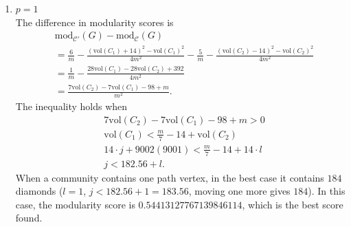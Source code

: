 \documentclass[letterpaper,12pt]{article}
\begin{document}
\begin{enumerate}
      \item $p = 1$\\
            The difference in modularity scores is
            \begin{align*}
                   & \text{mod}_{\mathcal{C'}}(G) - \text{mod}_{\mathcal{C}} (G)                                                                                       \\
                   & = \frac{6}{m} - \frac{(\text{vol}(C_1)+14)^2 - \text{vol}(C_1)^2}{4m^2} - \frac{5}{m} - \frac{(\text{vol}(C_2) - 14)^2 - \text{vol}(C_2)^2}{4m^2} \\
                   & = \frac{1}{m} - \frac{28\text{vol}(C_1) - 28\text{vol}(C_2) + 392}{4m^2}                                                                          \\
                   & = \frac{7\text{vol}(C_2) - 7\text{vol}(C_1) - 98 + m}{m^2}.
            \end{align*}
            The inequality holds when
            \begin{align*}
                   & 7\text{vol}(C_2) - 7\text{vol}(C_1) - 98 + m > 0        \\
                   & \text{vol}(C_1) < \frac{m}{7} - 14 + \text{vol}(C_2)    \\
                   & 14 \cdot j + 9002(9001) < \frac{m}{7} - 14 + 14 \cdot l \\
                   & j < 182.56 + l.
            \end{align*}
            When a community contains one path vertex, in the best case it contains $184$ diamonds ($l = 1$, $j < 182.56 + 1 = 183.56$, moving one more gives $184$). In this case, the modularity score is $0.54413127767139846114$, which is the best score found.


\end{enumerate}
\end{document}
